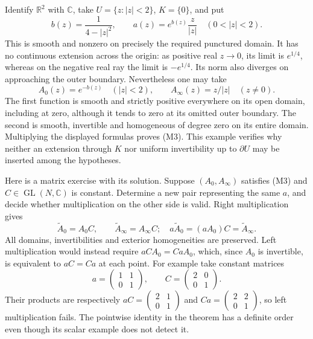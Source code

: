 \documentclass[
  11pt,
]{article}
\begin{document}
Identify \(\mathbb R^2\) with \(\mathbb C\), take \(U=\{z:|z|<2\}\),
\(K=\{0\}\), and put \[
b(z)=\frac1{4-|z|^2},\qquad
a(z)=e^{b(z)}\frac{z}{|z|}\quad(0<|z|<2).
\tag{M30}
\] This is smooth and nonzero on precisely the required punctured
domain. It has no continuous extension across the origin: as positive
real \(z\to0\), its limit is \(e^{1/4}\), whereas on the negative real
ray the limit is \(-e^{1/4}\). Its norm also diverges on approaching the
outer boundary. Nevertheless one may take \[
A_0(z)=e^{-b(z)}\quad(|z|<2),
\qquad
A_\infty(z)=z/|z|\quad(z\ne0).
\tag{M31}
\] The first function is smooth and strictly positive everywhere on its
open domain, including at zero, although it tends to zero at its omitted
outer boundary. The second is smooth, invertible and homogeneous of
degree zero on its entire domain. Multiplying the displayed formulas
proves (M3). This example verifies why neither an extension through
\(K\) nor uniform invertibility up to \(\partial U\) may be inserted
among the hypotheses.

Here is a matrix exercise with its solution. Suppose \((A_0,A_\infty)\)
satisfies (M3) and \(C\in\operatorname{GL}(N,\mathbb C)\) is constant.
Determine a new pair representing the same \(a\), and decide whether
multiplication on the other side is valid. Right multiplication gives \[
\widetilde A_0=A_0 C,
\qquad
\widetilde A_\infty=A_\infty C;
\quad
a\widetilde A_0=(aA_0)C=\widetilde A_\infty.
\tag{M32}
\] All domains, invertibilities and exterior homogeneities are
preserved. Left multiplication would instead require
\(a C A_0=C a A_0\), which, since \(A_0\) is invertible, is equivalent
to \(aC=Ca\) at each point. For example take constant matrices \[
a=\begin{pmatrix}1&1\\0&1\end{pmatrix},\qquad
C=\begin{pmatrix}2&0\\0&1\end{pmatrix}.
\tag{M33}
\] Their products are respectively
\(aC=\begin{pmatrix}2&1\\0&1\end{pmatrix}\) and
\(Ca=\begin{pmatrix}2&2\\0&1\end{pmatrix}\), so left multiplication
fails. The pointwise identity in the theorem has a definite order even
though its scalar example does not detect it.
\end{document}
